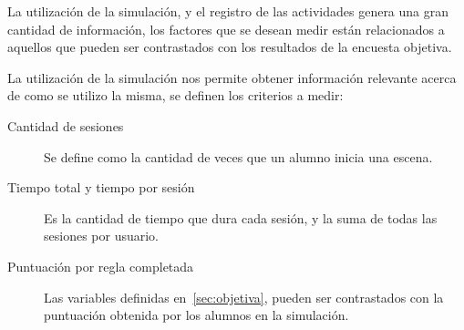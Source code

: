 La utilización de la simulación, y el registro de las actividades genera una
gran cantidad de información, los factores que se desean medir están
relacionados a aquellos que pueden ser contrastados con los resultados de la
encuesta objetiva.

La utilización de la simulación nos permite obtener información relevante acerca
de como se utilizo la misma, se definen los criterios a medir:

\begin{description}

\item[Cantidad de sesiones] Se define como la cantidad de veces que un alumno
    inicia una escena. 

\item[Tiempo total y tiempo por sesión] Es la cantidad de tiempo que dura cada
    sesión, y la suma de todas las sesiones por usuario.

\item[Puntuación por regla completada] Las variables definidas
    en~\ref{sec:objetiva}, pueden ser contrastados con la puntuación obtenida
    por los alumnos en la simulación.

\end{description}



